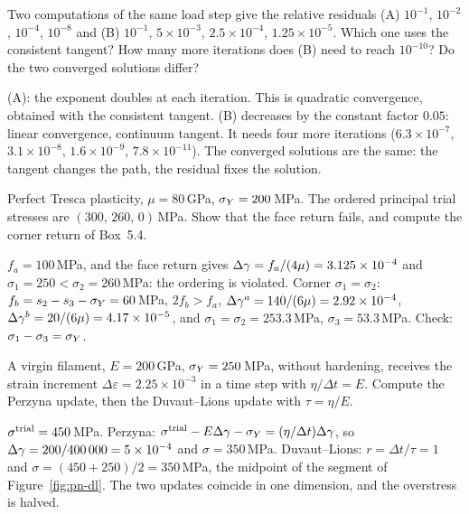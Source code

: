 \label{exo:pn-q-newton}
%
Two computations of the same load step give the relative residuals
(A) $10^{-1}$, $10^{-2}$, $10^{-4}$, $10^{-8}$ and (B) $10^{-1}$,
$5\times10^{-3}$, $2.5\times10^{-4}$, $1.25\times10^{-5}$. Which one uses the
consistent tangent? How many more iterations does (B) need to reach
$10^{-10}$? Do the two converged solutions differ?
\begin{solution}
(A): the exponent doubles at each iteration. This is quadratic convergence,
obtained with the consistent tangent. (B) decreases by the constant factor
$0.05$: linear convergence, continuum tangent. It needs four more iterations
($6.3\times10^{-7}$, $3.1\times10^{-8}$, $1.6\times10^{-9}$,
$7.8\times10^{-11}$). The converged solutions are the same: the tangent
changes the path, the residual fixes the solution.
\end{solution}

\label{exo:pn-q-tresca}
%
Perfect Tresca plasticity, $\mu=80$\,GPa, $\sigma_{Y}=200$\,MPa. The ordered
principal trial stresses are $(300,\,260,\,0)$\,MPa. Show that the face
return fails, and compute the corner return of Box~5.4.
\begin{solution}
$f_a=100$\,MPa, and the face return gives $\Delta\gamma=f_a/(4\mu)=3.125\times10^{-4}$
and $\sigma_1=250<\sigma_2=260$\,MPa: the ordering is violated. Corner
$\sigma_1=\sigma_2$: $f_b=s_2-s_3-\sigma_{Y}=60$\,MPa, $2f_b>f_a$,
$\Delta\gamma^a=140/(6\mu)=2.92\times10^{-4}$, $\Delta\gamma^b=20/(6\mu)=4.17\times10^{-5}$, and
$\sigma_1=\sigma_2=253.3$\,MPa, $\sigma_3=53.3$\,MPa. Check:
$\sigma_1-\sigma_3=\sigma_{Y}$.
\end{solution}

\label{exo:pn-q-visco}
%
A virgin filament, $E=200$\,GPa, $\sigma_{Y}=250$\,MPa, without hardening, receives
the strain increment $\Delta\varepsilon=2.25\times10^{-3}$ in a time step
with $\eta/\Delta t=E$. Compute the Perzyna update, then the Duvaut--Lions
update with $\tau=\eta/E$.
\begin{solution}
$\sigma^{\mathrm{trial}}=450$\,MPa. Perzyna:
$\sigma^{\mathrm{trial}}-E\Delta\gamma-\sigma_{Y}=(\eta/\Delta t)\Delta\gamma$, so $\Delta\gamma=200/400\,000=5\times10^{-4}$
and $\sigma=350$\,MPa. Duvaut--Lions: $r=\Delta t/\tau=1$ and
$\sigma=(450+250)/2=350$\,MPa, the midpoint of the segment of
Figure~\ref{fig:pn-dl}. The two updates coincide in one dimension, and the
overstress is halved.
\end{solution}

